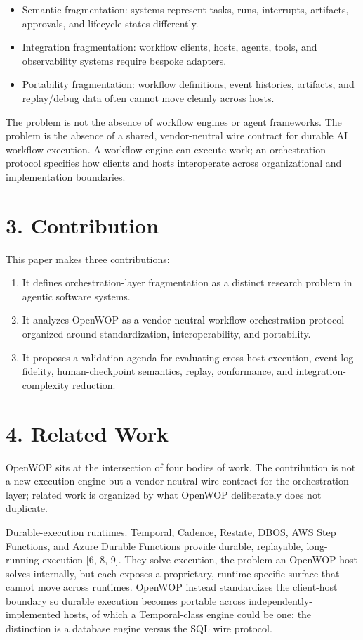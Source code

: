 \documentclass[11pt]{article}
\begin{document}
\begin{itemize}[leftmargin=*]
\item Semantic fragmentation: systems represent tasks, runs, interrupts, artifacts, approvals, and lifecycle states differently.
\item Integration fragmentation: workflow clients, hosts, agents, tools, and observability systems require bespoke adapters.
\item Portability fragmentation: workflow definitions, event histories, artifacts, and replay/debug data often cannot move cleanly across hosts.
\end{itemize}
The problem is not the absence of workflow engines or agent frameworks. The problem is the absence of a shared, vendor-neutral wire contract for durable AI workflow execution. A workflow engine can execute work; an orchestration protocol specifies how clients and hosts interoperate across organizational and implementation boundaries.

\section*{3. Contribution}
This paper makes three contributions:

\begin{enumerate}[leftmargin=*]
\item It defines orchestration-layer fragmentation as a distinct research problem in agentic software systems.
\item It analyzes OpenWOP as a vendor-neutral workflow orchestration protocol organized around standardization, interoperability, and portability.
\item It proposes a validation agenda for evaluating cross-host execution, event-log fidelity, human-checkpoint semantics, replay, conformance, and integration-complexity reduction.
\end{enumerate}
\section*{4. Related Work}
OpenWOP sits at the intersection of four bodies of work. The contribution is not a new execution engine but a vendor-neutral wire contract for the orchestration layer; related work is organized by what OpenWOP deliberately does not duplicate.

Durable-execution runtimes. Temporal, Cadence, Restate, DBOS, AWS Step Functions, and Azure Durable Functions provide durable, replayable, long-running execution [6, 8, 9]. They solve execution, the problem an OpenWOP host solves internally, but each exposes a proprietary, runtime-specific surface that cannot move across runtimes. OpenWOP instead standardizes the client-host boundary so durable execution becomes portable across independently-implemented hosts, of which a Temporal-class engine could be one: the distinction is a database engine versus the SQL wire protocol.
\end{document}
